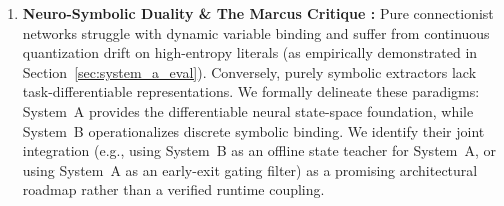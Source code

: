 \documentclass[11pt,a4paper]{article}
\begin{document}
\begin{enumerate}[leftmargin=*]
    \item \textbf{Neuro-Symbolic Duality \& The Marcus Critique \cite{marcus2019rebooting}:} Pure connectionist networks struggle with dynamic variable binding and suffer from continuous quantization drift on high-entropy literals (as empirically demonstrated in Section~\ref{sec:system_a_eval}). Conversely, purely symbolic extractors lack task-differentiable representations. We formally delineate these paradigms: System~A provides the differentiable neural state-space foundation, while System~B operationalizes discrete symbolic binding. We identify their joint integration (e.g., using System~B as an offline state teacher for System~A, or using System~A as an early-exit gating filter) as a promising architectural roadmap rather than a verified runtime coupling.
\end{enumerate}
\end{document}
